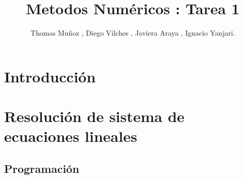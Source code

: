 \documentclass{udpreport}
\title{Metodos Numéricos : Tarea 1}
\author{Thomas Muñoz , Diego Vilches , Javiera Araya , Ignacio Yanjari.}
\begin{document}
\maketitle
\tableofcontents
\listoffigures
\chapter{Introducción}

\chapter{Resolución de sistema de ecuaciones lineales} %
 \section{Programación}
 
\end{document}

